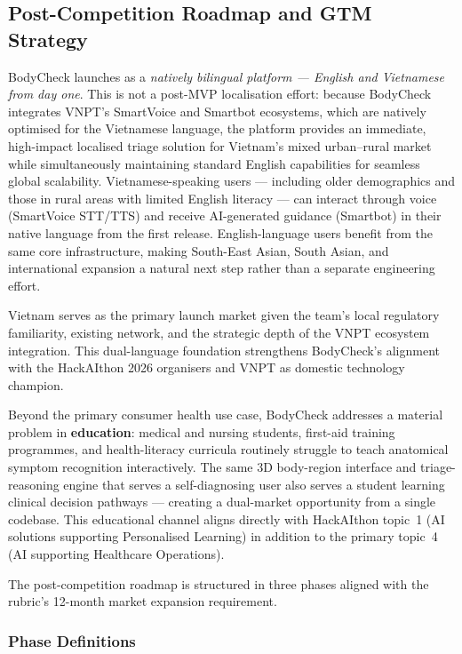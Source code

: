 \subsection{Post-Competition Roadmap and GTM Strategy}
\label{sec:feasibility-gtm}

BodyCheck launches as a \emph{natively bilingual platform --- English and
Vietnamese from day one}. This is not a post-MVP localisation effort: because
BodyCheck integrates VNPT's SmartVoice and Smartbot ecosystems, which are
natively optimised for the Vietnamese language, the platform provides an
immediate, high-impact localised triage solution for Vietnam's mixed
urban--rural market while simultaneously maintaining standard English
capabilities for seamless global scalability. Vietnamese-speaking users ---
including older demographics and those in rural areas with limited English
literacy --- can interact through voice (SmartVoice STT/TTS) and receive
AI-generated guidance (Smartbot) in their native language from the first
release. English-language users benefit from the same core infrastructure,
making South-East Asian, South Asian, and international expansion a natural
next step rather than a separate engineering effort.

Vietnam serves as the primary launch market given the team's local regulatory
familiarity, existing network, and the strategic depth of the VNPT ecosystem
integration. This dual-language foundation strengthens BodyCheck's alignment
with the HackAIthon 2026 organisers and VNPT as domestic technology champion.

Beyond the primary consumer health use case, BodyCheck addresses a material
problem in \textbf{education}: medical and nursing students, first-aid
training programmes, and health-literacy curricula routinely struggle to
teach anatomical symptom recognition interactively. The same 3D body-region
interface and triage-reasoning engine that serves a self-diagnosing user
also serves a student learning clinical decision pathways --- creating a
dual-market opportunity from a single codebase. This educational channel
aligns directly with HackAIthon topic~1 (AI solutions supporting
Personalised Learning) in addition to the primary topic~4 (AI supporting
Healthcare Operations).

The post-competition roadmap is structured in three phases aligned with
the rubric's 12-month market expansion requirement.

\subsubsection*{Phase Definitions}

